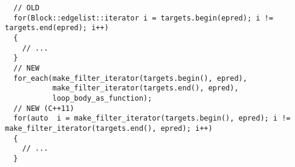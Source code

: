 \begin{lstlisting}
  // OLD
  for(Block::edgelist::iterator i = targets.begin(epred); i != targets.end(epred); i++)
  {
    // ...
  }
  // NEW
  for_each(make_filter_iterator(targets.begin(), epred),
           make_filter_iterator(targets.end(), epred),
           loop_body_as_function);
  // NEW (C++11)
  for(auto  i = make_filter_iterator(targets.begin(), epred); i != make_filter_iterator(targets.end(), epred); i++)
  {
    // ...
  }
  

\end{lstlisting}
